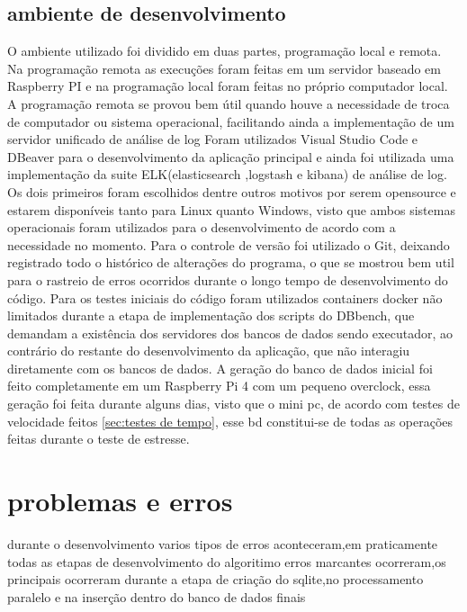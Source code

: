 \documentclass[
	12pt,				%
	openright,			%
	oneside,			%
	a4paper,			%
	english,			%
	french,				%
	spanish,			%
	brazil,				%
	]{abntex2}
\begin{document}
\section{ambiente de desenvolvimento}
\label{sec:ambiente de desenvolvimento}
O ambiente utilizado foi dividido em duas partes, programação local e remota. Na programação remota as execuções foram feitas em um servidor baseado em Raspberry PI e na programação local foram feitas no próprio computador local. A programação remota se provou bem útil quando houve a necessidade de troca de computador ou sistema operacional, facilitando ainda a implementação de um servidor unificado de análise de log\newline
Foram utilizados Visual Studio Code e DBeaver para o desenvolvimento da aplicação principal e ainda foi utilizada uma implementação da suite ELK(elasticsearch ,logstash e kibana) de análise de log. Os dois primeiros foram escolhidos dentre outros motivos por serem opensource e estarem disponíveis tanto para Linux quanto Windows, visto que ambos sistemas operacionais foram utilizados para o desenvolvimento de acordo com a necessidade no momento.\newline
Para o controle de versão foi utilizado o Git, deixando registrado todo o histórico de alterações do programa, o que se mostrou bem util para o rastreio de erros ocorridos durante o longo tempo de desenvolvimento do código.\newline
Para os testes iniciais do código foram utilizados containers docker não limitados durante a etapa de implementação dos scripts do DBbench, que demandam a existência dos servidores dos bancos de dados sendo executador, ao contrário do restante do desenvolvimento da aplicação, que não interagiu diretamente com os bancos de dados.\newline
A geração do banco de dados inicial foi feito completamente em um Raspberry Pi 4 com um pequeno overclock, essa geração foi feita durante alguns dias, visto que o mini pc, de acordo com testes de velocidade feitos \autoref{sec:testes de tempo}, esse bd constitui-se de todas as operações feitas durante o teste de estresse.


\chapter{problemas e erros}
\label{ch:problemas e erros}
durante o desenvolvimento varios tipos de erros aconteceram,em praticamente todas as etapas de desenvolvimento do algoritimo erros marcantes ocorreram,os principais ocorreram durante a etapa de criação do sqlite,no processamento paralelo e na inserção dentro do banco de dados finais
\end{document}
